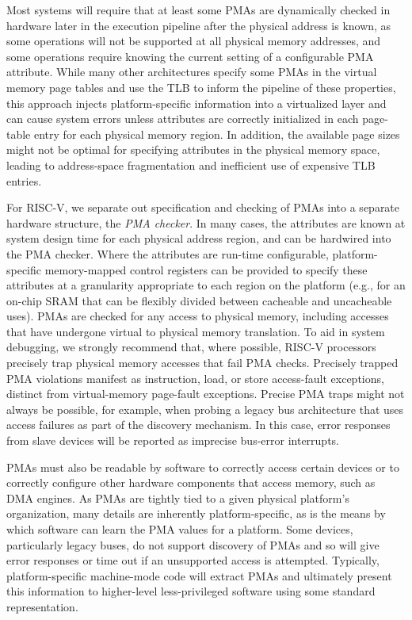 Most systems will require that at least some PMAs are dynamically
checked in hardware later in the execution pipeline after the physical
address is known, as some operations will not be supported at all
physical memory addresses, and some operations require knowing the
current setting of a configurable PMA attribute.  While many other architectures
specify some PMAs in the virtual memory page tables and use the TLB to
inform the pipeline of these properties, this approach injects platform-specific
information into a virtualized layer and can cause system errors
unless attributes are correctly initialized in each page-table entry
for each physical memory region.  In addition, the available
page sizes might not be optimal for specifying attributes in the
physical memory space, leading to address-space fragmentation and
inefficient use of expensive TLB entries.

For RISC-V, we separate out specification and checking of PMAs into a
separate hardware structure, the {\em PMA checker}.  In many cases,
the attributes are known at system design time for each physical
address region, and can be hardwired into the PMA checker.  Where the
attributes are run-time configurable, platform-specific memory-mapped
control registers can be provided to specify these attributes at a
granularity appropriate to each region on the platform (e.g., for an
on-chip SRAM that can be flexibly divided between cacheable and
uncacheable uses).  PMAs are checked for any access to physical
memory, including accesses that have undergone virtual to physical
memory translation.  To aid in system debugging, we strongly recommend
that, where possible, RISC-V processors precisely trap physical memory
accesses that fail PMA checks.  Precisely trapped PMA violations manifest
as instruction, load, or store access-fault exceptions, distinct from
virtual-memory page-fault exceptions. Precise PMA traps might not always be
possible, for example, when probing a legacy bus architecture that
uses access failures as part of the discovery mechanism.  In this
case, error responses from slave devices will be reported as imprecise
bus-error interrupts.

PMAs must also be readable by software to correctly access certain
devices or to correctly configure other hardware components that
access memory, such as DMA engines.  As PMAs are tightly tied to a
given physical platform's organization, many details are inherently
platform-specific, as is the means by which software can learn the PMA
values for a platform.  Some
devices, particularly legacy buses, do not support discovery of PMAs
and so will give error responses or time out if an unsupported access
is attempted.  Typically, platform-specific machine-mode code will
extract PMAs and ultimately present this information to higher-level
less-privileged software using some standard representation.

